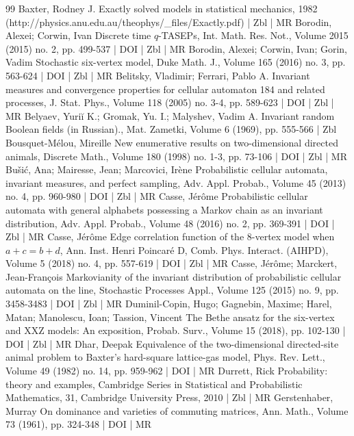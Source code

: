 \documentclass[10pt]{amsart}
\theoremstyle{definition}\newtheorem{defi}[theo]{Definition}\newtheorem{rema}[theo]{Remark}\newtheorem{exam}[theo]{Example}\newtheorem{exem}[theo]{Example}\newtheorem{nota}[theo]{Notation}
\newcounter{a}
\begin{document}
\begin{thebibliography}{99}
Baxter, Rodney J. Exactly solved models in statistical mechanics, 1982 (http://physics.anu.edu.au/theophys/\_files/Exactly.pdf) | Zbl | MR
Borodin, Alexei; Corwin, Ivan Discrete time $q$-TASEPs, Int. Math. Res. Not., Volume 2015 (2015) no. 2, pp. 499-537 | DOI | Zbl | MR
Borodin, Alexei; Corwin, Ivan; Gorin, Vadim Stochastic six-vertex model, Duke Math. J., Volume 165 (2016) no. 3, pp. 563-624 | DOI | Zbl | MR
Belitsky, Vladimir; Ferrari, Pablo A. Invariant measures and convergence properties for cellular automaton 184 and related processes, J. Stat. Phys., Volume 118 (2005) no. 3-4, pp. 589-623 | DOI | Zbl | MR
Belyaev, Yuriĭ K.; Gromak, Yu. I.; Malyshev, Vadim A. Invariant random Boolean fields (in Russian)., Mat. Zametki, Volume 6 (1969), pp. 555-566 | Zbl
Bousquet-Mélou, Mireille New enumerative results on two-dimensional directed animals, Discrete Math., Volume 180 (1998) no. 1-3, pp. 73-106 | DOI | Zbl | MR
Bušić, Ana; Mairesse, Jean; Marcovici, Irène Probabilistic cellular automata, invariant measures, and perfect sampling, Adv. Appl. Probab., Volume 45 (2013) no. 4, pp. 960-980 | DOI | Zbl | MR
Casse, Jérôme Probabilistic cellular automata with general alphabets possessing a Markov chain as an invariant distribution, Adv. Appl. Probab., Volume 48 (2016) no. 2, pp. 369-391 | DOI | Zbl | MR
Casse, Jérôme Edge correlation function of the 8-vertex model when $ a+ c=b+ d$, Ann. Inst. Henri Poincaré D, Comb. Phys. Interact. (AIHPD), Volume 5 (2018) no. 4, pp. 557-619 | DOI | Zbl | MR
Casse, Jérôme; Marckert, Jean-François Markovianity of the invariant distribution of probabilistic cellular automata on the line, Stochastic Processes Appl., Volume 125 (2015) no. 9, pp. 3458-3483 | DOI | Zbl | MR
Duminil-Copin, Hugo; Gagnebin, Maxime; Harel, Matan; Manolescu, Ioan; Tassion, Vincent The Bethe ansatz for the six-vertex and XXZ models: An exposition, Probab. Surv., Volume 15 (2018), pp. 102-130 | DOI | Zbl | MR
Dhar, Deepak Equivalence of the two-dimensional directed-site animal problem to Baxter’s hard-square lattice-gas model, Phys. Rev. Lett., Volume 49 (1982) no. 14, pp. 959-962 | DOI | MR
Durrett, Rick Probability: theory and examples, Cambridge Series in Statistical and Probabilistic Mathematics, 31, Cambridge University Press, 2010 | Zbl | MR
Gerstenhaber, Murray On dominance and varieties of commuting matrices, Ann. Math., Volume 73 (1961), pp. 324-348 | DOI | MR

\end{thebibliography}
\end{document}
